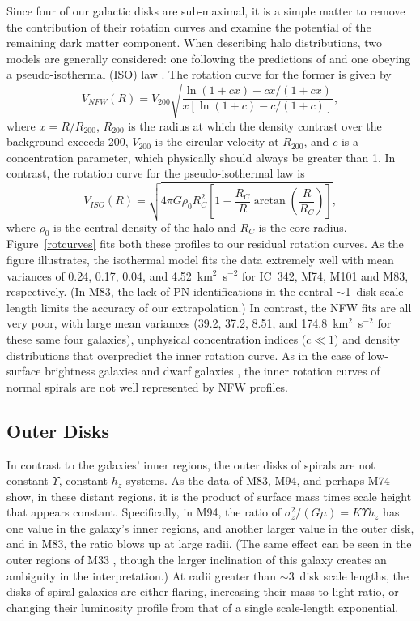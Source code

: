 \documentclass[12pt,preprint]{emulateapj}
\newcommand{\eg}{{e.g.,}}
\begin{document}
Since four of our galactic disks are sub-maximal, it is a simple matter to remove the contribution of their rotation curves and examine the potential of the remaining dark matter component.  When describing halo distributions, two models are generally considered:  one following the predictions of \citet[][hereafter NFW]{NFW96, NFW97} and one obeying a pseudo-isothermal (ISO) law \citep{bs80, kent86}.  The rotation curve for the former is given by
\begin{equation}
V_{NFW}(R) = V_{200}\sqrt{\frac{\ln (1+cx)-cx/(1+cx)}{x[\ln (1+c) - c/(1+c)]}},
\label{NFW}
\end{equation}
where $x = R/R_{200}$, $R_{200}$ is the radius at which the density contrast over the background exceeds 200, $V_{200}$ is the circular velocity at $R_{200}$, and $c$ is a concentration parameter, which physically should always be greater than 1.  In contrast, the rotation curve for the pseudo-isothermal law is 
\begin{equation}
V_{ISO}(R) = \sqrt{4\pi G \rho_0 R_C^2 \left[1-\frac{R_C}{R}
\arctan\left(\frac{R}{R_C}\right)\right]},
\label{ISO}
\end{equation}
where $\rho_0$ is the central density of the halo and $R_C$ is the core radius.  Figure~\ref{rotcurves} fits both these profiles to our residual rotation curves.  As the figure illustrates, the isothermal model fits the data extremely well with mean variances of 0.24, 0.17, 0.04, and 4.52~km$^2$~s$^{-2}$ for IC~342, M74, M101 and M83, respectively.  (In M83, the lack of PN identifications in the central $\sim$1~disk scale length limits the accuracy of our extrapolation.)  In contrast, the NFW fits are all very poor, with large mean variances (39.2, 37.2, 8.51, and 174.8~km$^2$~s$^{-2}$ for these same four galaxies), unphysical concentration indices ($c \ll 1$) and density distributions that overpredict the inner rotation curve.  As in the case of low-surface brightness galaxies \citep[\eg][]{kuzio} and dwarf galaxies \citep[\eg][]{oh+08}, the inner rotation curves of normal spirals are not well represented by NFW profiles.

\subsection{Outer Disks}

In contrast to the galaxies' inner regions, the outer disks of spirals are not constant $\Upsilon$, constant $h_z$ systems.  As the data of M83, M94, and perhaps M74 show, in these distant regions, it is the product of surface mass times scale height that appears constant.  Specifically, in M94, the ratio of $\sigma_z^2 / (G \mu) = K \Upsilon h_z$ has one value in the galaxy's inner regions, and another larger value in the outer disk, and in M83, the ratio blows up at large radii.  (The same effect can be seen in the outer regions of M33 \citep{M33PNe}, though the larger inclination of this galaxy creates an ambiguity in the interpretation.)  At radii greater than $\sim$3~disk scale lengths, the disks of spiral galaxies are either flaring, increasing their mass-to-light ratio, or changing their luminosity profile from that of a single scale-length exponential.
\end{document}

